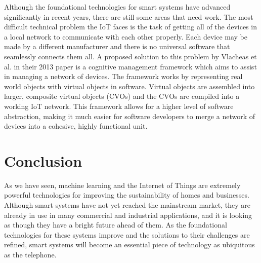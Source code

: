 \documentclass[letterpaper]{article}
\begin{document}
Although the foundational technologies for smart systems have advanced significantly in recent years, there are still some areas that need work. The most difficult technical problem the IoT faces is the task of getting all of the devices in a local network to communicate with each other properly. Each device may be made by a different manufacturer and there is no universal software that seamlessly connects them all. A proposed solution to this problem by Vlacheas et al. \cite{vlacheas13} in their 2013 paper is a cognitive management framework which aims to assist in managing a network of devices. The framework works by representing real world objects with virtual objects in software. Virtual objects are assembled into larger, composite virtual objects (CVOs) and the CVOs are compiled into a working IoT network. This framework allows for a higher level of software abstraction, making it much easier for software developers to merge a network of devices into a cohesive, highly functional unit.

\section{Conclusion} \label{conc}
As we have seen, machine learning and the Internet of Things are extremely powerful technologies for improving the sustainability of homes and businesses. Although smart systems have not yet reached the mainstream market, they are already in use in many commercial and industrial applications, and it is looking as though they have a bright future ahead of them. As the foundational technologies for these systems improve and the solutions to their challenges are refined, smart systems will become an essential piece of technology as ubiquitous as the telephone.

\clearpage
\printbibliography
\end{document}
